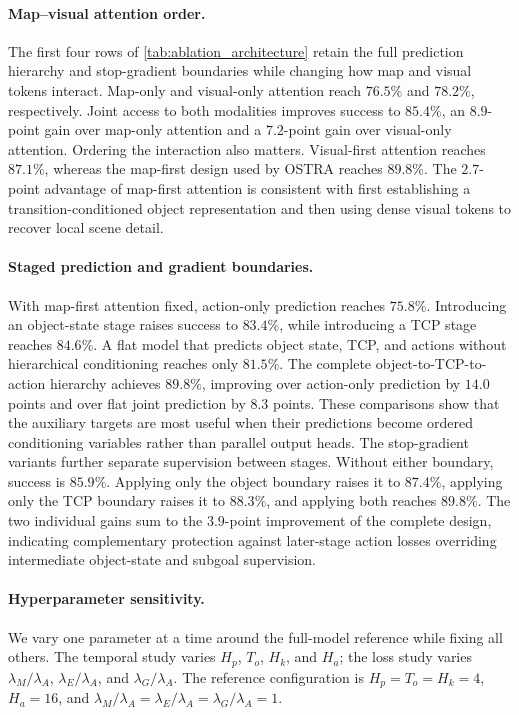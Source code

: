 \paragraph{Map--visual attention order.}
The first four rows of \cref{tab:ablation_architecture} retain the full
prediction hierarchy and stop-gradient boundaries while changing how map and
visual tokens interact. Map-only and visual-only attention reach $76.5\%$ and
$78.2\%$, respectively. Joint access to both modalities improves success to
$85.4\%$, an $8.9$-point gain over map-only attention and a $7.2$-point gain
over visual-only attention. Ordering the interaction also matters. Visual-first
attention reaches $87.1\%$, whereas the map-first design used by OSTRA reaches
$89.8\%$. The $2.7$-point advantage of map-first attention is consistent with
first establishing a transition-conditioned object representation and then
using dense visual tokens to recover local scene detail.

\paragraph{Staged prediction and gradient boundaries.}
With map-first attention fixed, action-only prediction reaches $75.8\%$.
Introducing an object-state stage raises success to $83.4\%$, while introducing
a TCP stage reaches $84.6\%$. A flat model that predicts object state, TCP, and
actions without hierarchical conditioning reaches only $81.5\%$. The complete
object-to-TCP-to-action hierarchy achieves $89.8\%$, improving over action-only
prediction by $14.0$ points and over flat joint prediction by $8.3$ points.
These comparisons show that the auxiliary targets are most useful when their
predictions become ordered conditioning variables rather than parallel output
heads. The stop-gradient variants further separate supervision between stages.
Without either boundary, success is $85.9\%$. Applying only the object boundary
raises it to $87.4\%$, applying only the TCP boundary raises it to $88.3\%$,
and applying both reaches $89.8\%$. The two individual gains sum to the
$3.9$-point improvement of the complete design, indicating complementary
protection against later-stage action losses overriding intermediate
object-state and subgoal supervision.

\paragraph{Hyperparameter sensitivity.}
We vary one parameter at a time around the full-model reference while fixing
all others. The temporal study varies $H_p$, $T_o$, $H_k$, and $H_a$; the loss
study varies $\lambda_M/\lambda_A$, $\lambda_E/\lambda_A$, and
$\lambda_G/\lambda_A$. The reference configuration is
$H_p=T_o=H_k=4$, $H_a=16$, and
$\lambda_M/\lambda_A=\lambda_E/\lambda_A=\lambda_G/\lambda_A=1$.

